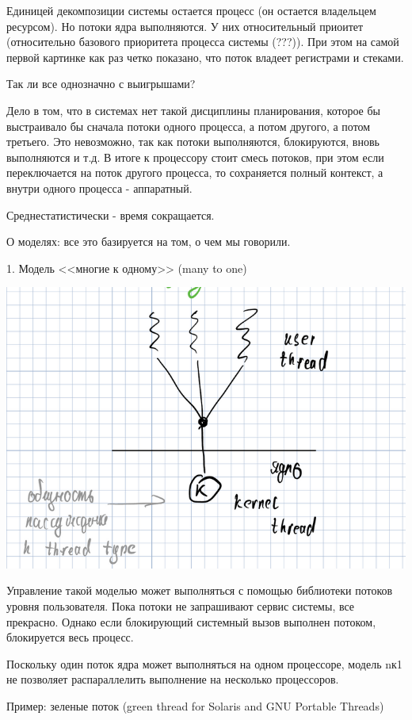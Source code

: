 \documentclass[a4paper, 12pt]{report}
\begin{document}
	Единицей декомпозиции системы остается процесс (он остается владельцем ресурсом). Но потоки ядра выполняются. У них относительный приоитет (относительно базового приоритета процесса системы (???)). При этом на самой первой картинке как раз четко показано, что поток владеет регистрами и стеками.
	
	Так ли все однозначно с выигрышами?
	
	Дело в том, что в системах нет такой дисциплины планирования, которое бы выстраивало бы сначала потоки одного процесса, а потом другого, а потом третьего. Это невозможно, так как потоки выполняются, блокируются, вновь выполняются и т.д. В итоге к процессору стоит смесь потоков, при этом если переключается на поток другого процесса, то сохраняется полный контекст, а внутри одного процесса - аппаратный.
	
	Среднестатистически - время сокращается.
	
	О моделях: все это базируется на том, о чем мы говорили.
	
	1. Модель <<многие к одному>> (many to one)
	
	\includegraphics[width=\linewidth]{7}
	
	Управление такой моделью может выполняться с помощью библиотеки потоков уровня пользователя. Пока потоки не запрашивают сервис системы, все прекрасно. Однако если блокирующий системный вызов выполнен потоком, блокируется весь процесс.
	
	Поскольку один поток ядра может выполняться на одном процессоре, модель nк1 не позволяет распараллелить выполнение на несколько процессоров.
	
	Пример: зеленые поток (green thread for Solaris and GNU Portable Threads)
	
\end{document}
